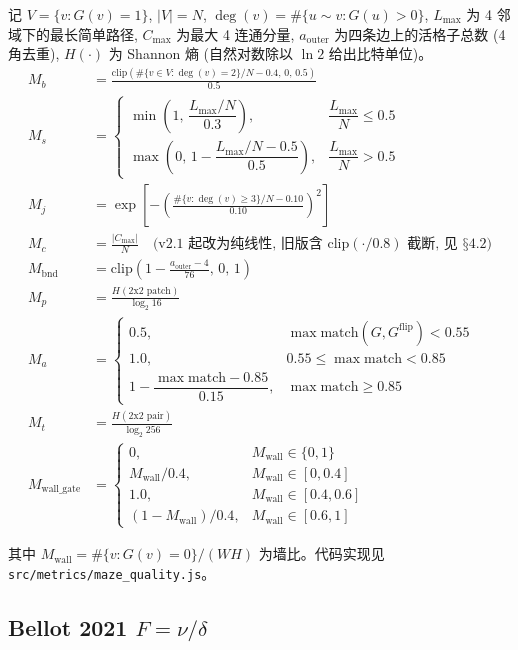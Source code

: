 记 $V = \{v : G(v) = 1\}$, $|V| = N$, $\deg(v) = \#\{u \sim v : G(u) > 0\}$, $L_{\max}$ 为 4 邻域下的最长简单路径, $C_{\max}$ 为最大 4 连通分量, $a_{\text{outer}}$ 为四条边上的活格子总数 (4 角去重), $H(\cdot)$ 为 Shannon 熵 (自然对数除以 $\ln 2$ 给出比特单位)。
\begin{align*}
  M_b &= \frac{\mathrm{clip}\!\left(\#\{v \in V : \deg(v) = 2\} / N - 0.4,\, 0,\, 0.5\right)}{0.5} \\
  M_s &= \begin{cases}
    \min\!\left(1,\, \dfrac{L_{\max}/N}{0.3}\right), & \dfrac{L_{\max}}{N} \le 0.5 \\
    \max\!\left(0,\, 1 - \dfrac{L_{\max}/N - 0.5}{0.5}\right), & \dfrac{L_{\max}}{N} > 0.5
  \end{cases} \\
  M_j &= \exp\!\left[-\left(\frac{\#\{v : \deg(v) \ge 3\} / N - 0.10}{0.10}\right)^{2}\right] \\
  M_c &= \frac{|C_{\max}|}{N} \quad \text{(v2.1 起改为纯线性, 旧版含 $\mathrm{clip}(\cdot/0.8)$ 截断, 见 §4.2)} \\
  M_{\text{bnd}} &= \mathrm{clip}\!\left(1 - \frac{a_{\text{outer}} - 4}{76},\, 0,\, 1\right) \\
  M_p &= \frac{H(\text{2x2 patch})}{\log_2 16} \\
  M_a &= \begin{cases}
    0.5, & \max \mathrm{match}(G, G^{\text{flip}}) < 0.55 \\
    1.0, & 0.55 \le \max \mathrm{match} < 0.85 \\
    1 - \dfrac{\max \mathrm{match} - 0.85}{0.15}, & \max \mathrm{match} \ge 0.85
  \end{cases} \\
  M_t &= \frac{H(\text{2x2 pair})}{\log_2 256} \\
  M_{\text{wall\_gate}} &=
  \begin{cases}
    0, & M_{\text{wall}} \in \{0, 1\} \\
    M_{\text{wall}} / 0.4, & M_{\text{wall}} \in [0, 0.4] \\
    1.0, & M_{\text{wall}} \in [0.4, 0.6] \\
    (1 - M_{\text{wall}}) / 0.4, & M_{\text{wall}} \in [0.6, 1]
  \end{cases}
\end{align*}

其中 $M_{\text{wall}} = \#\{v : G(v) = 0\} / (W H)$ 为墙比。代码实现见 \texttt{src/metrics/maze\_quality.js}。

\subsection{Bellot 2021 $F = \nu/\delta$}

